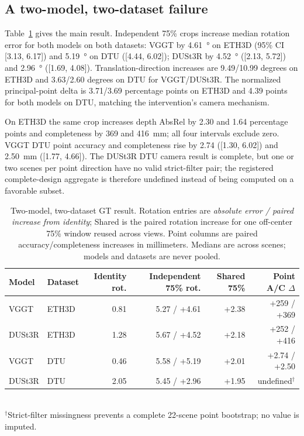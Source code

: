 \subsection{A two-model, two-dataset failure}
Table~\ref{tab:cross-dataset} gives the main result.  Independent 75\% crops
increase median rotation error for both models on both datasets: VGGT by
\SI{4.61}{\degree} on ETH3D (95\% CI [3.13, 6.17]) and
\SI{5.19}{\degree} on DTU ([4.44, 6.02]); DUSt3R by
\SI{4.52}{\degree} ([2.13, 5.72]) and \SI{2.96}{\degree}
([1.69, 4.08]).  Translation-direction increases are 9.49/10.99 degrees on
ETH3D and 3.63/2.60 degrees on DTU for VGGT/DUSt3R.  The normalized
principal-point delta is 3.71/3.69 percentage points on ETH3D and 4.39 points
for both models on DTU, matching the intervention's camera mechanism.

On ETH3D the same crop increases depth AbsRel by 2.30 and 1.64 percentage
points and completeness by 369 and \SI{416}{\milli\meter}; all four intervals
exclude zero.  VGGT DTU point accuracy and completeness rise by 2.74
([1.30, 6.02]) and \SI{2.50}{\milli\meter} ([1.77, 4.66]).  The DUSt3R DTU
camera result is complete, but one or two scenes per point direction have no
valid strict-filter pair; the registered complete-design aggregate is therefore
undefined instead of being computed on a favorable subset.

\begin{table}[t]
  \centering
  \caption{Two-model, two-dataset GT result.  Rotation entries are
  \emph{absolute error / paired increase from identity}; Shared is the paired
  rotation increase for one off-center 75\% window reused across views. Point
  columns are paired accuracy/completeness increases in millimeters. Medians
  are across scenes; models and datasets are never pooled.}
  \label{tab:cross-dataset}
  \setlength{\tabcolsep}{6pt}
  \begin{tabular}{llrrrr}
    \toprule
    Model & Dataset & Identity rot. & Independent 75\% rot. & Shared 75\% & Point A/C $\Delta$ \\
    \midrule
    VGGT   & ETH3D & 0.81 & 5.27 / +4.61 & +2.38 & +259 / +369 \\
    DUSt3R & ETH3D & 1.28 & 5.67 / +4.52 & +2.18 & +252 / +416 \\
    VGGT   & DTU   & 0.46 & 5.58 / +5.19 & +2.01 & +2.74 / +2.50 \\
    DUSt3R & DTU   & 2.05 & 5.45 / +2.96 & +1.95 & undefined$^\dagger$ \\
    \bottomrule
  \end{tabular}
  \\[1pt]
  {\footnotesize $^\dagger$Strict-filter missingness prevents a complete 22-scene point bootstrap; no value is imputed.}
\end{table}

